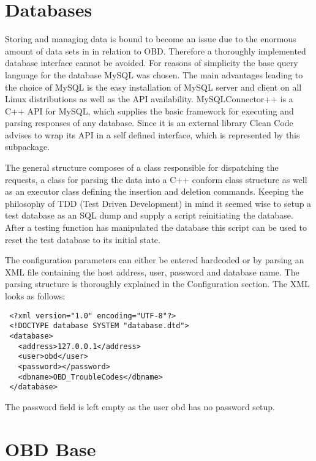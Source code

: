 
\section{Databases}

Storing and managing data is bound to become an issue due to the enormous amount of data sets in in relation to OBD. Therefore a thoroughly 
implemented database interface cannot be avoided. For reasons of simplicity the base query language for the database MySQL was chosen. The main 
advantages leading to the choice of MySQL is the easy installation of MySQL server and client on all Linux distributions as well as the API 
availability. MySQLConnector++ is a C++ API for MySQL, which supplies the basic framework for executing and parsing responses of any database. 
Since it is an external library  Clean Code advises to wrap its API in a self defined interface, which is represented by this subpackage. 

The general structure composes of a class responsible for dispatching the requests, a class for parsing the data into a C++ conform class 
structure as well as an executor class defining the insertion and deletion commands. Keeping the philosophy of TDD (Test Driven Development) 
in mind it seemed wise to setup a test database as an SQL dump and supply a script reinitiating the database. After a testing function has 
manipulated the database this script can be used to reset the test database to its initial state. 

The configuration parameters can either be entered hardcoded or by parsing an XML file containing the host address, user, password and database 
name. The parsing  structure is thoroughly explained in the Configuration section. The XML looks as follows:

\begin{lstlisting}
 <?xml version="1.0" encoding="UTF-8"?>
 <!DOCTYPE database SYSTEM "database.dtd">
 <database>
   <address>127.0.0.1</address>
   <user>obd</user>
   <password></password>
   <dbname>OBD_TroubleCodes</dbname>
 </database>
\end{lstlisting}

The password field is left empty as the user obd has no password setup.  


\section{OBD Base}

